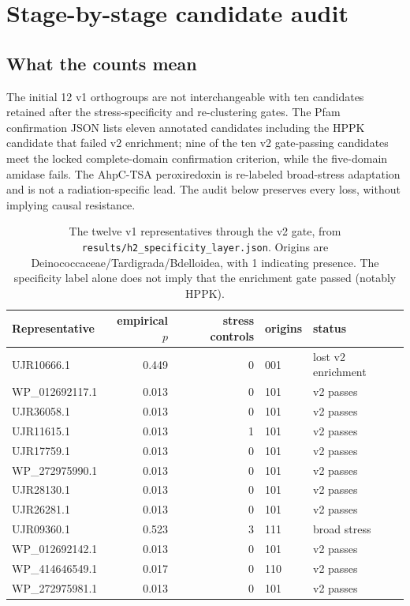 \section{Stage-by-stage candidate audit}
\subsection{What the counts mean}
The initial 12 v1 orthogroups are not interchangeable with ten candidates retained after the stress-specificity and re-clustering gates. The Pfam confirmation JSON lists eleven annotated candidates including the HPPK candidate that failed v2 enrichment; nine of the ten v2 gate-passing candidates meet the locked complete-domain confirmation criterion, while the five-domain amidase fails. The AhpC-TSA peroxiredoxin is re-labeled broad-stress adaptation and is not a radiation-specific lead. The audit below preserves every loss, without implying causal resistance.
\begin{table}[!htbp]\centering\small\caption{The twelve v1 representatives through the v2 gate, from \texttt{results/h2\_specificity\_layer.json}. Origins are Deinococcaceae/Tardigrada/Bdelloidea, with 1 indicating presence. The specificity label alone does not imply that the enrichment gate passed (notably HPPK).}\begin{tabular}{lrrll}\hline Representative & empirical $p$ & stress controls & origins & status \\\hline
UJR10666.1 & 0.449 & 0 & 001 & lost v2 enrichment \\
WP\_012692117.1 & 0.013 & 0 & 101 & v2 passes \\
UJR36058.1 & 0.013 & 0 & 101 & v2 passes \\
UJR11615.1 & 0.013 & 1 & 101 & v2 passes \\
UJR17759.1 & 0.013 & 0 & 101 & v2 passes \\
WP\_272975990.1 & 0.013 & 0 & 101 & v2 passes \\
UJR28130.1 & 0.013 & 0 & 101 & v2 passes \\
UJR26281.1 & 0.013 & 0 & 101 & v2 passes \\
UJR09360.1 & 0.523 & 3 & 111 & broad stress \\
WP\_012692142.1 & 0.013 & 0 & 101 & v2 passes \\
WP\_414646549.1 & 0.017 & 0 & 110 & v2 passes \\
WP\_272975981.1 & 0.013 & 0 & 101 & v2 passes \\
\hline\end{tabular}\end{table}
